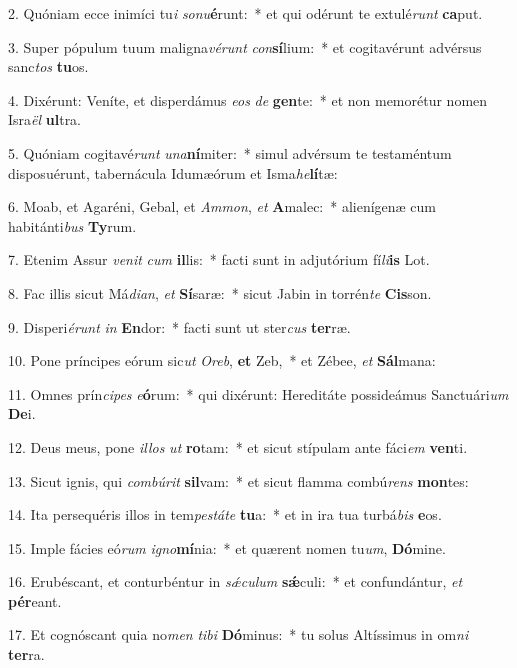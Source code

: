 2. Quóniam ecce inimíci tu\textit{i} \textit{so}\textit{nu}\textbf{é}runt:~*  et qui odérunt te extulé\textit{runt} \textbf{ca}put.\

3. Super pópulum tuum maligna\textit{vé}\textit{runt} \textit{con}\textbf{sí}lium:~*  et cogitavérunt advérsus sanc\textit{tos} \textbf{tu}os.\

4. Dixérunt: Veníte, et disperdámus \textit{e}\textit{os} \textit{de} \textbf{gen}te:~*  et non memorétur nomen Isra\textit{ël} \textbf{ul}tra.\

5. Quóniam cogitavé\textit{runt} \textit{u}\textit{na}\textbf{ní}miter:~*  simul advérsum te testaméntum disposuérunt, tabernácula Idumæórum et Isma\textit{he}\textbf{lí}tæ:\

6. Moab, et Agaréni, Gebal, et \textit{Am}\textit{mon}, \textit{et} \textbf{A}malec:~*  alienígenæ cum habitánti\textit{bus} \textbf{Ty}rum.\

7. Etenim Assur \textit{ve}\textit{nit} \textit{cum} \textbf{il}lis:~*  facti sunt in adjutórium fí\textit{li}\textbf{is} Lot.\

8. Fac illis sicut Má\textit{di}\textit{an}, \textit{et} \textbf{Sí}saræ:~*  sicut Jabin in torrén\textit{te} \textbf{Cis}son.\

9. Disperi\textit{é}\textit{runt} \textit{in} \textbf{En}dor:~*  facti sunt ut ster\textit{cus} \textbf{ter}ræ.\

10. Pone príncipes eórum sic\textit{ut} \textit{O}\textit{reb}, \textbf{et} Zeb,~*  et Zébee, \textit{et} \textbf{Sál}mana:\

11. Omnes prín\textit{ci}\textit{pes} \textit{e}\textbf{ó}rum:~*  qui dixérunt: Hereditáte possideámus Sanctuári\textit{um} \textbf{De}i.\

12. Deus meus, pone \textit{il}\textit{los} \textit{ut} \textbf{ro}tam:~*  et sicut stípulam ante fáci\textit{em} \textbf{ven}ti.\

13. Sicut ignis, qui \textit{com}\textit{bú}\textit{rit} \textbf{sil}vam:~*  et sicut flamma combú\textit{rens} \textbf{mon}tes:\

14. Ita persequéris illos in tem\textit{pes}\textit{tá}\textit{te} \textbf{tu}a:~*  et in ira tua turbá\textit{bis} \textbf{e}os.\

15. Imple fácies eó\textit{rum} \textit{i}\textit{gno}\textbf{mí}nia:~*  et quærent nomen tu\textit{um}, \textbf{Dó}mine.\

16. Erubéscant, et conturbéntur in \textit{sǽ}\textit{cu}\textit{lum} \textbf{sǽ}culi:~*  et confundántur, \textit{et} \textbf{pér}eant.\

17. Et cognóscant quia no\textit{men} \textit{ti}\textit{bi} \textbf{Dó}minus:~*  tu solus Altíssimus in om\textit{ni} \textbf{ter}ra.\

